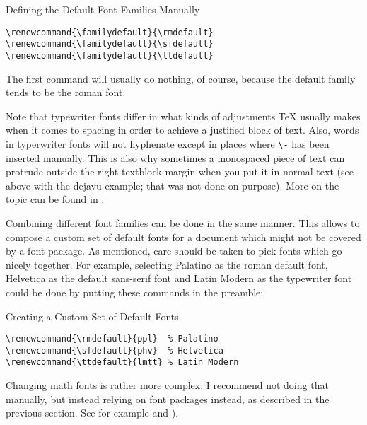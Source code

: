 \documentclass[a4paper,oneside,11pt]{article}
\newcommand\code[1]{\texttt{#1}}
\begin{document}
\begin{titled-frame}
{\textsf{Defining the Default Font Families Manually}}
\vspace{-1em}
\begin{verbatim}
\renewcommand{\familydefault}{\rmdefault}
\renewcommand{\familydefault}{\sfdefault}
\renewcommand{\familydefault}{\ttdefault}
\end{verbatim}
\vspace{-1em}
\end{titled-frame}

The first  command will  usually do  nothing, of  course, because  the default
family tends to be the roman font.

Note that typewriter fonts differ in  what kinds of adjustments \TeX{} usually
makes  when it  comes to  spacing in  order to  achieve a  justified block  of
text.  Also,  words in typerwriter fonts  will not hyphenate except  in places
where  \code{\textbackslash{}-}  has  been  inserted  manually. This  is  also
why  sometimes a  monospaced  piece of  text can  protrude  outside the  right
textblock margin  when you put  it in normal text  (see above with  the dejavu
example; that  was not  done on purpose). More  on the topic  can be  found in
\cite{texblog:typewriter}.

Combining different font families can be  done in the same manner. This allows
to compose  a custom set of  default fonts for  a document which might  not be
covered by  a font package. As mentioned,  care should be taken  to pick fonts
which go nicely together. For example, selecting Palatino as the roman default
font,  Helvetica as  the  default  sans-serif font  and  Latin  Modern as  the
typewriter font could be done by putting these commands in the preamble:

\begin{titled-frame}
{\textsf{Creating a Custom Set of Default Fonts}}
\vspace{-1em}
\begin{verbatim}
\renewcommand{\rmdefault}{ppl}  % Palatino
\renewcommand{\sfdefault}{phv}  % Helvetica
\renewcommand{\ttdefault}{lmtt} % Latin Modern
\end{verbatim}
\vspace{-1em}
\end{titled-frame}

Changing  math  fonts is  rather  more  complex. I  recommend not  doing  that
manually,  but  instead  relying  on   font  packages  instead,  as  described
in  the  previous  section. See for  example  \cite{stackexch:math-fonts}  and
\cite{practex:fonts}).
\end{document}
